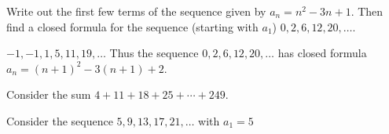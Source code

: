 \begin{questions}
	
	


\question Write out the first few terms of the sequence given by $a_n = n^2 - 3n + 1$.  Then find a closed formula for the sequence (starting with $a_1$) $0, 2, 6, 12, 20, \ldots$.

	\begin{answer}
		$-1, -1, 1, 5, 11, 19,\ldots$  Thus the sequence $0, 2, 6, 12, 20,\ldots$ has closed formula $a_n = (n+1)^2 - 3(n+1) + 2$.
	\end{answer}
	
	
	
\question Consider the sum $4 + 11 + 18 + 25 + \cdots + 249$.

	\begin{answer}
	\end{answer}




\question Consider the sequence $5, 9, 13, 17, 21, \ldots$ with $a_1 = 5$
\end{questions}
